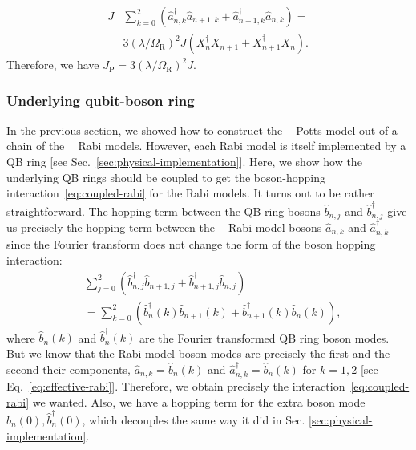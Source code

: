 \documentclass[reprint, aps, prx, amsmath, amssymb, longbibliography, superscriptaddress]{revtex4-2}
\DeclareMathOperator{\Zthree}{\mathbb{Z}_3}
\begin{document}
\begin{equation}
\begin{aligned}
    J &\sum\limits_{k=0}^{2} \left(\hat a_{n,k}^{\dagger} \hat a_{n+1,k} + \hat a_{n+1,k}^{\dagger} \hat a_{n,k}\right) = \\
    &3(\lambda/\Omega_{\textrm{R}})^2 J\left(X_n^{\dagger} X_{n+1} + X_{n+1}^{\dagger} X_n\right).
\end{aligned}
\end{equation}
Therefore, we have $J_{\text{P}} = 3(\lambda/\Omega_{\textrm{R}})^2 J$.


\subsubsection{Underlying qubit-boson ring}
\label{sec:underlying-qb-ring}

In the previous section, we showed how to construct the $\Zthree$ Potts model out of a chain of the $\Zthree$ Rabi models. However, each Rabi model is itself implemented by a QB ring [see Sec.~\ref{sec:physical-implementation}]. Here, we show how the underlying QB rings should be coupled to get the boson-hopping interaction~\eqref{eq:coupled-rabi} for the Rabi models. It turns out to be rather straightforward. The hopping term between the QB ring bosons $\hat b_{n,j}$ and $\hat b_{n,j}^{\dagger}$ give us precisely the hopping term between the $\Zthree$ Rabi model bosons $\hat a_{n,k}$ and $\hat a_{n,k}^{\dagger}$ since the Fourier transform does not change the form of the boson hopping interaction:
\begin{equation}
\begin{aligned}
    &\sum\limits_{j=0}^2 \left(\hat b_{n,j}^{\dagger} \hat b_{n+1,j} + \hat b_{n+1,j}^{\dagger} \hat b_{n,j}\right) \\
    &=\sum\limits_{k=0}^{2} \left(\hat b_{n}^{\dagger}(k) \hat b_{n+1}(k) + \hat b_{n+1}^{\dagger}(k) \hat b_{n}(k)\right),
\end{aligned}
\end{equation}
where $\hat b_{n}(k)$ and $\hat b_n^{\dagger}(k)$ are the Fourier transformed QB ring boson modes. But we know that the Rabi model boson modes are precisely the first and the second their components, $\hat a_{n,k} = \hat b_n(k)$ and $\hat a_{n,k}^{\dagger} = \hat b_n(k)$ for $k =1,2$ [see Eq.~\eqref{eq:effective-rabi}]. Therefore, we obtain precisely the interaction~\eqref{eq:coupled-rabi} we wanted. Also, we have a hopping term for the extra boson mode $\hat b_{n}(0), \hat b^{\dagger}_{n}(0)$, which decouples the same way it did in Sec. \ref{sec:physical-implementation}.
\end{document}
